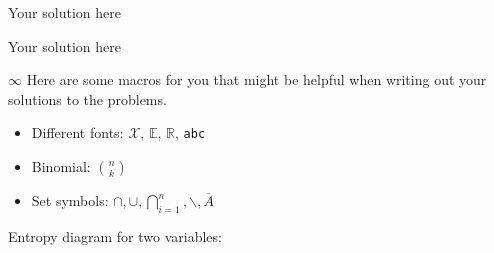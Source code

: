 \documentclass[a4paper,10pt]{article}
\begin{document}

\begin{question}{1}
Your solution here
\end{question}

\begin{question}{5}
Your solution here
\end{question}

\begin{question}{$\infty$}
Here are some macros for you that might be helpful when writing out your solutions to the problems.

\begin{itemize}
\item Different fonts: $\mathcal{X}$, $\mathbb{E}$, $\mathbb{R}$, \texttt{abc}
\item Binomial: $\binom{n}{k}$
\item Set symbols: $\cap, \cup, \bigcap_{i=1}^n, \backslash, \overline{A}$
\end{itemize}


Entropy diagram for two variables:
\begin{center}
\end{center}
\end{question}
\end{document}
